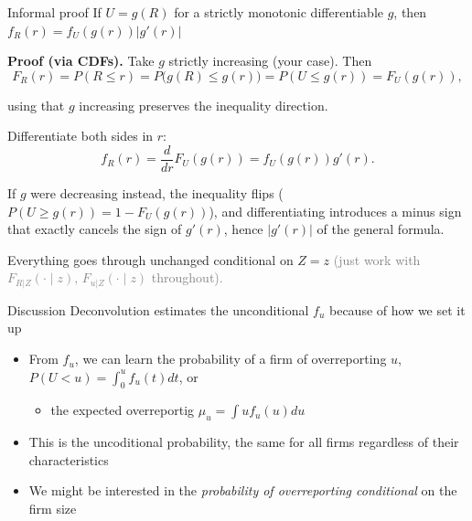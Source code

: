 \documentclass[
  ignorenonframetext,
  aspectratio=169,
]{beamer}
\providecommand{\tightlist}{%
  \setlength{\itemsep}{0pt}\setlength{\parskip}{0pt}}
\newcommand{\sm}[1]{\textcolor{gray}{\footnotesize #1}} %
\begin{document}
\begin{frame}{Informal proof}
\protect{}\label{informal-proof}
If \(U = g(R)\) for a strictly monotonic differentiable \(g\), then
\(f_R(r) = f_U(g(r))|g'(r)|\)

\textbf{Proof (via CDFs).} Take \(g\) strictly increasing (your case).
Then \[
F_R(r) = P(R\le r) = P\big(g(R)\le g(r)\big) = P(U\le g(r)) = F_U(g(r)),
\]

using that \(g\) increasing preserves the inequality direction.

Differentiate both sides in \(r\): \[
f_R(r) = \frac{d}{dr}F_U(g(r)) = f_U(g(r))g'(r).
\]

If \(g\) were decreasing instead, the inequality flips
(\(P(U\ge g(r))=1-F_U(g(r))\)), and differentiating introduces a minus
sign that exactly cancels the sign of \(g'(r)\), hence \(|g'(r)|\) of
the general formula.

Everything goes through unchanged conditional on \(Z=z\) \sm{(just work
with \(F_{R|Z}(\cdot\mid z)\), \(F_{u|Z}(\cdot\mid z)\) throughout).}
\end{frame}

\begin{frame}{Discussion}
\protect{}\label{discussion-1}
Deconvolution estimates the unconditional \(f_u\) because of how we set
it up

\begin{itemize}
\tightlist
\item
  From \(f_u\), we can learn the probability of a firm of overreporting
  \(u\), \(P(U<u)=\int_0^uf_u(t)dt\), or

  \begin{itemize}
  \tightlist
  \item
    the expected overreportig \(\mu_u=\int u f_u(u)du\)
  \end{itemize}
\item
  This is the uncoditional probability, the same for all firms
  regardless of their characteristics
\item
  We might be interested in the \emph{probability of overreporting
  conditional} on the firm size
\end{itemize}
\end{frame}
\end{document}
